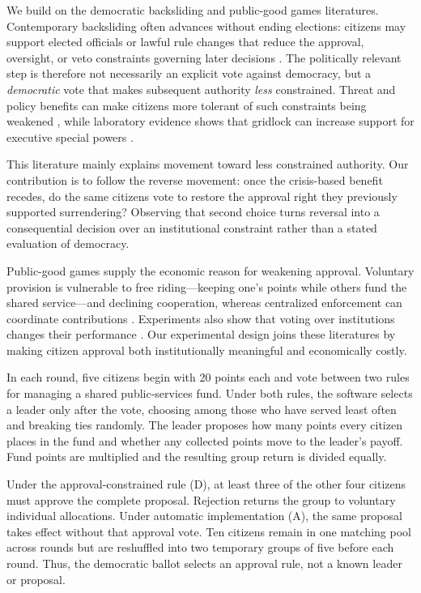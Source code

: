 \documentclass[11pt,a4paper]{article}
\newcommand{\Dproc}{\textsf{D}}
\newcommand{\Aproc}{\textsf{A}}
\begin{document}
We build on the democratic backsliding and public-good games literatures. Contemporary backsliding often advances without ending elections: citizens may support elected officials or lawful rule changes that reduce the approval, oversight, or veto constraints governing later decisions \parencite{Bermeo2016}. The politically relevant step is therefore not necessarily an explicit vote against democracy, but a \emph{democratic} vote that makes subsequent authority \emph{less} constrained. Threat and policy benefits can make citizens more tolerant of such constraints being weakened \parencites{HetheringtonSuhay2011}{Goodman2021}{0b3bf}, while laboratory evidence shows that gridlock can increase support for executive special powers \parencite{FortezaMussioPereyra2024}.

This literature mainly explains movement toward less constrained authority. Our contribution is to follow the reverse movement: once the crisis-based benefit recedes, do the same citizens vote to restore the approval right they previously supported surrendering? Observing that second choice turns reversal into a consequential decision over an institutional constraint rather than a stated evaluation of democracy.

Public-good games supply the economic reason for weakening approval. Voluntary provision is vulnerable to free riding---keeping one's points while others fund the shared service---and declining cooperation, whereas centralized enforcement can coordinate contributions \parencites{FehrGachter2000,FischbacherGachter2010,Hamman2011}. Experiments also show that voting over institutions changes their performance \parencites{DalBo2010,SutterHaignerKocher2010,MarkussenPuttermanTyran2014}. Our experimental design joins these literatures by making citizen approval both institutionally meaningful and economically costly.

In each round, five citizens begin with 20 points each and vote between two rules for managing a shared public-services fund. Under both rules, the software selects a leader only after the vote, choosing among those who have served least often and breaking ties randomly. The leader proposes how many points every citizen places in the fund and whether any collected points move to the leader's payoff. Fund points are multiplied and the resulting group return is divided equally.

Under the approval-constrained rule (\Dproc), at least three of the other four citizens must approve the complete proposal. Rejection returns the group to voluntary individual allocations. Under automatic implementation (\Aproc), the same proposal takes effect without that approval vote. Ten citizens remain in one matching pool across rounds but are reshuffled into two temporary groups of five before each round. Thus, the democratic ballot selects an approval rule, not a known leader or proposal.
\end{document}
